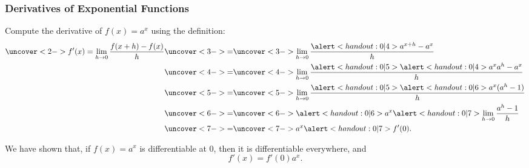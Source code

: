 \begin{frame}
\frametitle{Derivatives of Exponential Functions}
Compute the derivative of $f(x) = a^x$ using the definition:
\begin{align*}
\uncover<2->{f'(x) = \lim_{h\to 0} \frac{f(x+h)-f(x)}{h}} & \uncover<3->{=}  \uncover<3->{\lim_{h\to 0} \frac{\alert<handout:0| 4>{a^{x+h}}-a^x}{h}}\\
 & \uncover<4->{=}  \uncover<4->{\lim_{h\to 0} \frac{\alert<handout:0| 5>{\alert<handout:0| 4>{a^x a^h}-a^x}}{h}}\\
 & \uncover<5->{=}  \uncover<5->{\lim_{h\to 0} \frac{\alert<handout:0| 5>{\alert<handout:0| 6>{a^x} (a^h- 1)}}{h}}\\
 & \uncover<6->{=}  \uncover<6->{\alert<handout:0| 6>{a^x} \alert<handout:0| 7>{\lim_{h\to 0} \frac{a^h- 1}{h}}}\\
 & \uncover<7->{=}  \uncover<7->{a^x \alert<handout:0| 7>{f'(0)}.}
\end{align*}
\end{frame}


\begin{frame}
We have shown that, if $f(x) = a^x$ is differentiable at 0, then it is differentiable everywhere, and
\[
f'(x) = f'(0)a^x .
\]
\end{frame}
